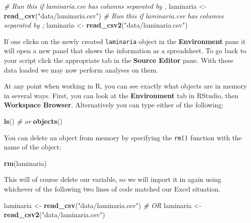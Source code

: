 \documentclass[
]{book}
\newenvironment{Shaded}{\begin{snugshade}}{\end{snugshade}}
\newcommand{\CommentTok}[1]{\textcolor[rgb]{0.56,0.35,0.01}{\textit{#1}}}
\newcommand{\KeywordTok}[1]{\textcolor[rgb]{0.13,0.29,0.53}{\textbf{#1}}}
\newcommand{\NormalTok}[1]{#1}
\newcommand{\StringTok}[1]{\textcolor[rgb]{0.31,0.60,0.02}{#1}}
\begin{document}
\begin{Shaded}
\begin{Highlighting}[]
\CommentTok{\# Run this if \textquotesingle{}laminaria.csv\textasciigrave{} has columns separated by \textquotesingle{},\textquotesingle{}}
\NormalTok{laminaria <{-}}\StringTok{ }\KeywordTok{read\_csv}\NormalTok{(}\StringTok{"data/laminaria.csv"}\NormalTok{)}
\CommentTok{\# Run this if \textquotesingle{}laminaria.csv\textasciigrave{} has columns separated by \textquotesingle{};\textquotesingle{}}
\NormalTok{laminaria <{-}}\StringTok{ }\KeywordTok{read\_csv2}\NormalTok{(}\StringTok{"data/laminaria.csv"}\NormalTok{)}
\end{Highlighting}
\end{Shaded}

If one clicks on the newly created \texttt{laminaria} object in the \textbf{Environment} pane it will open a new panel that shows the information as a spreadsheet. To go back to your script click the appropriate tab in the \textbf{Source Editor} pane. With these data loaded we may now perform analyses on them.

At any point when working in R, you can see exactly what objects are in memory in several ways. First, you can look at the \textbf{Environment} tab in RStudio, then \textbf{Workspace Browser}. Alternatively you can type either of the following:

\begin{Shaded}
\begin{Highlighting}[]
\KeywordTok{ls}\NormalTok{()}
\CommentTok{\# or}
\KeywordTok{objects}\NormalTok{()}
\end{Highlighting}
\end{Shaded}

You can delete an object from memory by specifying the \texttt{rm()} function with the name of the object:

\begin{Shaded}
\begin{Highlighting}[]
\KeywordTok{rm}\NormalTok{(laminaria)}
\end{Highlighting}
\end{Shaded}

This will of course delete our variable, so we will import it in again using whichever of the following two lines of code matched our Excel situation.

\begin{Shaded}
\begin{Highlighting}[]
\NormalTok{laminaria <{-}}\StringTok{ }\KeywordTok{read\_csv}\NormalTok{(}\StringTok{"data/laminaria.csv"}\NormalTok{)}
\CommentTok{\# OR}
\NormalTok{laminaria <{-}}\StringTok{ }\KeywordTok{read\_csv2}\NormalTok{(}\StringTok{"data/laminaria.csv"}\NormalTok{)}
\end{Highlighting}
\end{Shaded}
\end{document}
